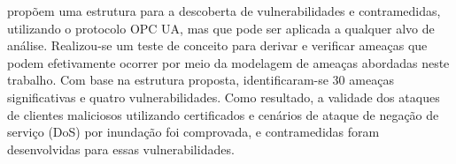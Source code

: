      propõem uma estrutura para a descoberta de vulnerabilidades e contramedidas, utilizando o protocolo OPC UA, mas que pode ser aplicada a qualquer alvo de análise. Realizou-se um teste de conceito para derivar e verificar ameaças que podem efetivamente ocorrer por meio da modelagem de ameaças abordadas neste trabalho. Com base na estrutura proposta, identificaram-se 30 ameaças significativas e quatro vulnerabilidades. Como resultado, a validade dos ataques de clientes maliciosos utilizando certificados e cenários de ataque de negação de serviço (DoS) por inundação foi comprovada, e contramedidas foram desenvolvidas para essas vulnerabilidades.